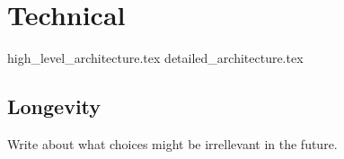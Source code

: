 \chapter{Technical}
\label{chap:technical}

{high_level_architecture.tex}
{detailed_architecture.tex}

\section{Longevity}
Write about what choices might be irrellevant in the future.
